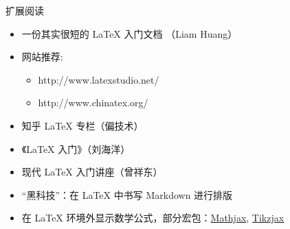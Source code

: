\begin{frame}{扩展阅读}
  \begin{itemize}
    \item 一份其实很短的 \LaTeX{} 入门文档 （Liam Huang） 
    \item 网站推荐:
      \begin{itemize}
        \item http://www.latexstudio.net/
        \item http://www.chinatex.org/
      \end{itemize}
    \item 知乎 \LaTeX{} 专栏（偏技术）
    \item 《\LaTeX{} 入门》（刘海洋）
    \item 现代 \LaTeX{} 入门讲座（曾祥东）
    \item “黑科技”：在 \LaTeX{} 中书写 Markdown 进行排版 
    \item 在 \LaTeX{} 环境外显示数学公式，部分宏包：\href{https://www.mathjax.org/}{Mathjax}, \href{https://github.com/kisonecat/tikzjax}{Tikzjax}

  \end{itemize}
\end{frame}



